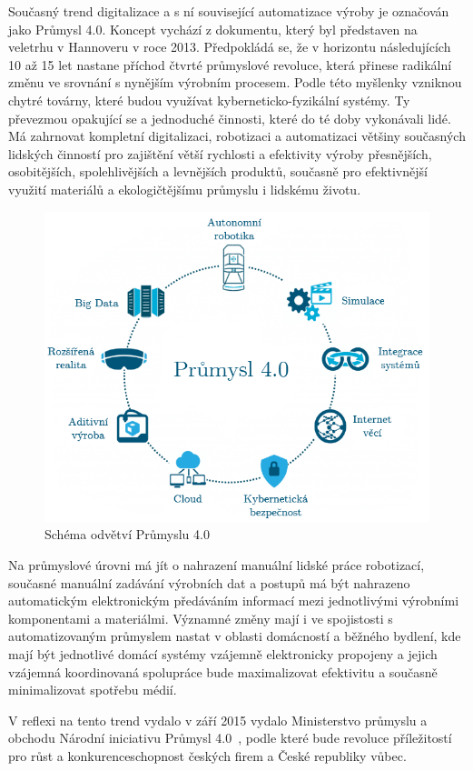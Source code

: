 Současný trend digitalizace a s ní související automatizace výroby je označován jako Průmysl 4.0. Koncept vychází z dokumentu, který byl představen na veletrhu v Hannoveru v roce 2013. Předpokládá se, že v horizontu následujících 10 až 15 let nastane příchod čtvrté průmyslové revoluce, která přinese radikální změnu ve srovnání s nynějším výrobním procesem. Podle této myšlenky vzniknou chytré továrny, které budou využívat kyberneticko-fyzikální systémy. Ty převezmou opakující se a jednoduché činnosti, které do té doby vykonávali lidé. Má zahrnovat kompletní digitalizaci, robotizaci a automatizaci většiny současných lidských činností pro zajištění větší rychlosti a efektivity výroby přesnějších, osobitějších, spolehlivějších a levnějších produktů, současně pro efektivnější využití materiálů a ekologičtějšímu průmyslu i lidskému životu.

\vspace{-10pt}	
	\begin{figure}[!ht]
  \begin{center}
   \includegraphics[scale=0.4]{obrazky/iot_industry4}
  \end{center}
	\vspace{-20pt}	
  \caption{Schéma odvětví Průmyslu 4.0}
\vspace{-10pt}	
\end{figure}



Na průmyslové úrovni má jít o nahrazení manuální lidské práce robotizací, současné manuální zadávání výrobních dat a postupů má být nahrazeno automatickým elektronickým předáváním informací mezi jednotlivými výrobními komponentami a materiálmi. Významné změny mají i ve spojistosti s automatizovaným průmyslem nastat v oblasti domácností a běžného bydlení, kde mají být jednotlivé domácí systémy vzájemně elektronicky propojeny a jejich vzájemná koordinovaná spolupráce bude maximalizovat efektivitu a současně minimalizovat spotřebu médií.

V reflexi na tento trend vydalo v září 2015 vydalo Ministerstvo průmyslu a obchodu Národní iniciativu Průmysl 4.0~\cite{uvod_prumysl_4_pdf}, podle které bude revoluce příležitostí pro růst a konkurenceschopnost českých firem a České republiky vůbec.










